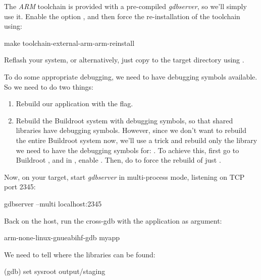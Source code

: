 The {\em ARM} toolchain is provided with a pre-compiled {\em
  gdbserver}, so we'll simply use it. Enable the option
, and then force the
re-installation of the toolchain using:

\begin{bashinput}
make toolchain-external-arm-arm-reinstall
\end{bashinput}

Reflash your system, or alternatively, just copy
 to the target 
directory using .

To do some appropriate debugging, we need to have debugging symbols
available. So we need to do two things:

\begin{enumerate}

\item Rebuild our application with the  flag.

\item Rebuild the Buildroot system with debugging symbols, so that
  shared libraries have debugging symbols. However, since we don't
  want to rebuild the entire Buildroot system now, we'll use a trick
  and rebuild only the library we need to have the debugging symbols
  for: . To achieve this, first go to Buildroot
  , and in , enable
  . Then, do  to force the rebuild of just
  .

\end{enumerate}

Now, on your target, start {\em gdbserver} in multi-process mode,
listening on TCP port 2345:

\begin{bashinput}
gdbserver --multi localhost:2345
\end{bashinput}

Back on the host, run the cross-gdb with the  application
as argument:

\begin{bashinput}
arm-none-linux-gnueabihf-gdb myapp
\end{bashinput}

We need to tell  where the libraries can be found:

\begin{bashinput}
(gdb) set sysroot output/staging
\end{bashinput}

